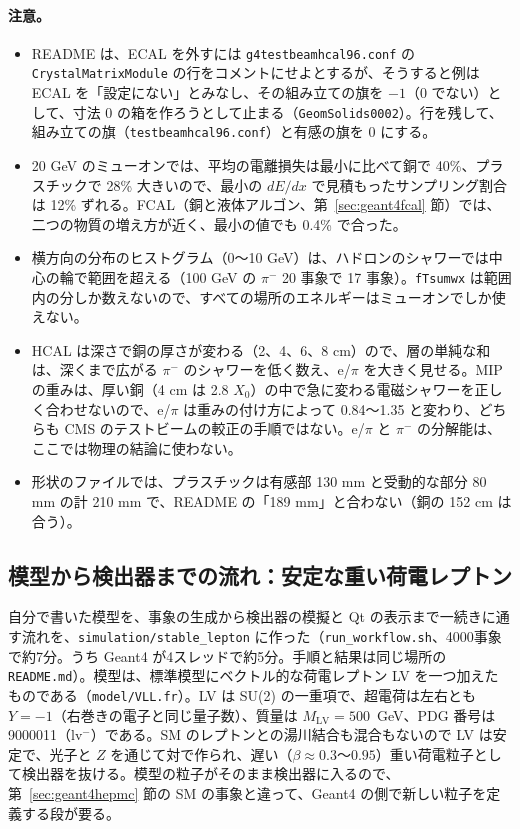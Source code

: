 \documentclass[a4paper,10pt]{ltjsarticle}
\begin{document}
\paragraph{注意。}
\begin{itemize}
\item README は、ECAL を外すには \texttt{g4testbeamhcal96.conf} の \texttt{CrystalMatrixModule} の行をコメントにせよとするが、そうすると例は ECAL を「設定にない」とみなし、その組み立ての旗を $-1$（0 でない）として、寸法 0 の箱を作ろうとして止まる（\texttt{GeomSolids0002}）。行を残して、組み立ての旗（\texttt{testbeamhcal96.conf}）と有感の旗を 0 にする。
\item 20 GeV のミューオンでは、平均の電離損失は最小に比べて銅で 40\%、プラスチックで 28\% 大きいので、最小の $dE/dx$ で見積もったサンプリング割合は 12\% ずれる。FCAL（銅と液体アルゴン、第~\ref{sec:geant4fcal} 節）では、二つの物質の増え方が近く、最小の値でも 0.4\% で合った。
\item 横方向の分布のヒストグラム（0〜10 GeV）は、ハドロンのシャワーでは中心の輪で範囲を超える（100 GeV の $\pi^-$ 20 事象で 17 事象）。\texttt{fTsumwx} は範囲内の分しか数えないので、すべての場所のエネルギーはミューオンでしか使えない。
\item HCAL は深さで銅の厚さが変わる（2、4、6、8 cm）ので、層の単純な和は、深くまで広がる $\pi^-$ のシャワーを低く数え、e/$\pi$ を大きく見せる。MIP の重みは、厚い銅（4 cm は 2.8 $X_0$）の中で急に変わる電磁シャワーを正しく合わせないので、e/$\pi$ は重みの付け方によって 0.84〜1.35 と変わり、どちらも CMS のテストビームの較正の手順ではない。e/$\pi$ と $\pi^-$ の分解能は、ここでは物理の結論に使わない。
\item 形状のファイルでは、プラスチックは有感部 130 mm と受動的な部分 80 mm の計 210 mm で、README の「189 mm」と合わない（銅の 152 cm は合う）。
\end{itemize}

\subsection{模型から検出器までの流れ：安定な重い荷電レプトン}\label{sec:geant4vll}

自分で書いた模型を、事象の生成から検出器の模擬と Qt の表示まで一続きに通す流れを、\nolinkurl{simulation/stable_lepton} に作った（\texttt{run\_workflow.sh}、4000事象で約7分。うち Geant4 が4スレッドで約5分。手順と結果は同じ場所の \texttt{README.md}）。模型は、標準模型にベクトル的な荷電レプトン LV を一つ加えたものである（\texttt{model/VLL.fr}）。LV は SU(2) の一重項で、超電荷は左右とも $Y=-1$（右巻きの電子と同じ量子数）、質量は $M_{\mathrm{LV}}=500$~GeV、PDG 番号は 9000011（lv$^-$）である。SM のレプトンとの湯川結合も混合もないので LV は安定で、光子と $Z$ を通じて対で作られ、遅い（$\beta\approx0.3$〜$0.95$）重い荷電粒子として検出器を抜ける。模型の粒子がそのまま検出器に入るので、第~\ref{sec:geant4hepmc} 節の SM の事象と違って、Geant4 の側で新しい粒子を定義する段が要る。
\end{document}

